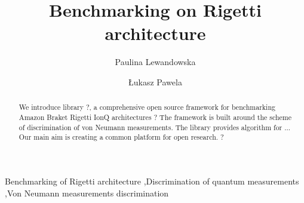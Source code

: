 \documentclass[preprint,12pt, a4paper]{elsarticle}
\newcommand{\1}{{\rm 1\hspace{-0.9mm}l}}
\begin{document}
\begin{frontmatter}



\title{Benchmarking on Rigetti architecture}


\author{Paulina Lewandowska}
\author{\L ukasz Pawela}

\address{Institute of Theoretical and Applied Informatics, Polish Academy
	of Sciences, Ba{\l}tycka 5, 44-100 Gliwice, Poland}

\begin{abstract}
We introduce library ?, a comprehensive open source framework for benchmarking Amazon Braket Rigetti IonQ architectures ? 
The framework is built around  the scheme of discrimination of von Neumann measurements. The library provides algorithm for ... Our main aim is creating a common platform  for open research.  ? 


\end{abstract}

\begin{keyword}
Benchmarking of Rigetti architecture \sep Discrimination of quantum measurements \sep Von Neumann measurements discrimination 



\end{keyword}

\end{frontmatter}
\end{document}
